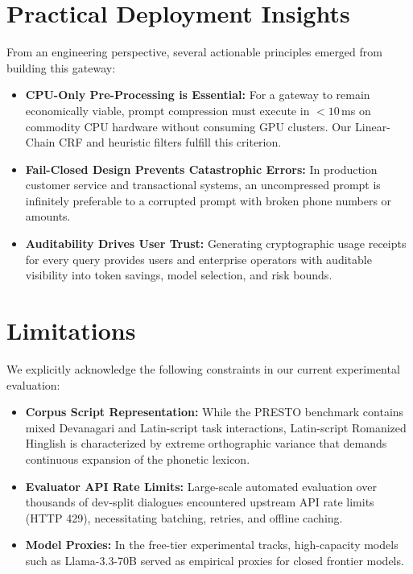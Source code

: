 \section{Practical Deployment Insights}
From an engineering perspective, several actionable principles emerged from building this gateway:
\begin{itemize}
    \item \textbf{CPU-Only Pre-Processing is Essential:} For a gateway to remain economically viable, prompt compression must execute in $<10$\,ms on commodity CPU hardware without consuming GPU clusters. Our Linear-Chain CRF and heuristic filters fulfill this criterion.
    \item \textbf{Fail-Closed Design Prevents Catastrophic Errors:} In production customer service and transactional systems, an uncompressed prompt is infinitely preferable to a corrupted prompt with broken phone numbers or amounts.
    \item \textbf{Auditability Drives User Trust:} Generating cryptographic usage receipts for every query provides users and enterprise operators with auditable visibility into token savings, model selection, and risk bounds.
\end{itemize}

\section{Limitations}
We explicitly acknowledge the following constraints in our current experimental evaluation:
\begin{itemize}
    \item \textbf{Corpus Script Representation:} While the PRESTO benchmark contains mixed Devanagari and Latin-script task interactions, Latin-script Romanized Hinglish is characterized by extreme orthographic variance that demands continuous expansion of the phonetic lexicon.
    \item \textbf{Evaluator API Rate Limits:} Large-scale automated evaluation over thousands of dev-split dialogues encountered upstream API rate limits (HTTP 429), necessitating batching, retries, and offline caching.
    \item \textbf{Model Proxies:} In the free-tier experimental tracks, high-capacity models such as Llama-3.3-70B served as empirical proxies for closed frontier models.
\end{itemize}

